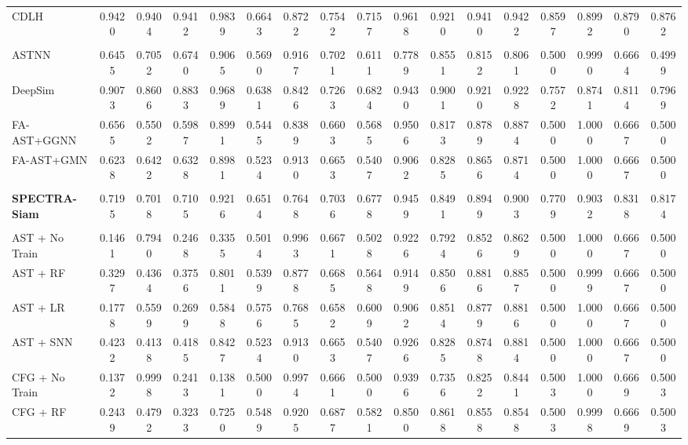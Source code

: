 \documentclass[authoryear,final,5p,times,twocolumn]{elsarticle}
\theoremstyle{plain}
\begin{document}
\begin{table}[t]
{\begin{tabular}{l*{16}{c}}
CDLH & 0.9420 & 0.9404 & 0.9412 & 0.9839 & 0.6643 & 0.8722 & 0.7542 & 0.7157 & 0.9618 & 0.9210 & 0.9410 & 0.9422 & 0.8597 & 0.8992 & 0.8790 & 0.8762 \\
\addlinespace[2pt]
\multicolumn{17}{l}{\textit{Other graph-based learning methods}} \\
ASTNN & 0.6455 & 0.7052 & 0.6740 & 0.9065 & 0.5690 & 0.9167 & 0.7021 & 0.6111 & 0.7789 & 0.8551 & 0.8152 & 0.8061 & 0.5000 & 0.9990 & 0.6664 & 0.4999 \\
DeepSim & 0.9073 & 0.8606 & 0.8833 & 0.9689 & 0.6381 & 0.8426 & 0.7263 & 0.6824 & 0.9430 & 0.9001 & 0.9210 & 0.9228 & 0.7572 & 0.8741 & 0.8114 & 0.7969 \\
FA-AST+GGNN & 0.6565 & 0.5502 & 0.5987 & 0.8991 & 0.5445 & 0.8389 & 0.6603 & 0.5685 & 0.9506 & 0.8173 & 0.8789 & 0.8874 & 0.5000 & 1.0000 & 0.6667 & 0.5000 \\
FA-AST+GMN & 0.6238 & 0.6422 & 0.6328 & 0.8981 & 0.5234 & 0.9130 & 0.6653 & 0.5407 & 0.9062 & 0.8285 & 0.8656 & 0.8714 & 0.5000 & 1.0000 & 0.6667 & 0.5000 \\
\addlinespace[2pt]
\multicolumn{17}{l}{\textit{Proposed method}} \\
\textbf{SPECTRA-Siam} & 0.7195 & 0.7018 & 0.7105 & 0.9216 & 0.6514 & 0.7648 & 0.7036 & 0.6778 & 0.9459 & 0.8491 & 0.8949 & 0.9003 & 0.7709 & 0.9032 & 0.8318 & 0.8174 \\
\addlinespace[2pt]
\multicolumn{17}{l}{\textit{Fixed spectral-representation baselines}} \\
AST + No Train & 0.1461 & 0.7940 & 0.2468 & 0.3355 & 0.5014 & 0.9963 & 0.6671 & 0.5028 & 0.9226 & 0.7924 & 0.8526 & 0.8629 & 0.5000 & 1.0000 & 0.6667 & 0.5000 \\
AST + RF & 0.3297 & 0.4364 & 0.3756 & 0.8011 & 0.5399 & 0.8778 & 0.6685 & 0.5648 & 0.9149 & 0.8506 & 0.8816 & 0.8857 & 0.5000 & 0.9999 & 0.6667 & 0.5000 \\
AST + LR & 0.1778 & 0.5599 & 0.2699 & 0.5848 & 0.5756 & 0.7685 & 0.6582 & 0.6009 & 0.9062 & 0.8514 & 0.8779 & 0.8816 & 0.5000 & 1.0000 & 0.6667 & 0.5000 \\
AST + SNN & 0.4232 & 0.4138 & 0.4185 & 0.8427 & 0.5234 & 0.9130 & 0.6653 & 0.5407 & 0.9266 & 0.8285 & 0.8748 & 0.8814 & 0.5000 & 1.0000 & 0.6667 & 0.5000 \\
CFG + No Train & 0.1372 & 0.9998 & 0.2413 & 0.1381 & 0.5000 & 0.9974 & 0.6661 & 0.5000 & 0.9396 & 0.7356 & 0.8252 & 0.8441 & 0.5003 & 1.0000 & 0.6669 & 0.5003 \\
CFG + RF & 0.2439 & 0.4792 & 0.3233 & 0.7250 & 0.5489 & 0.9205 & 0.6877 & 0.5821 & 0.8500 & 0.8618 & 0.8558 & 0.8548 & 0.5003 & 0.9998 & 0.6669 & 0.5003 \\

\end{tabular}}
\end{table}
\end{document}
